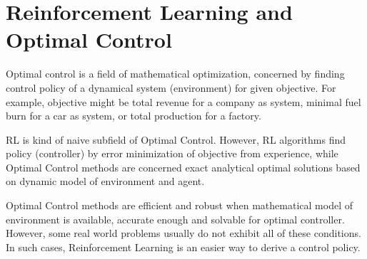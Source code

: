 \section{Reinforcement Learning and Optimal Control}
\label{sec:rl_and_control}

Optimal control is a field of mathematical optimization, 
concerned by  finding control policy of a dynamical system (environment) for given objective. 
For example, objective might be total revenue for a company as system, 
minimal fuel burn for a car as system, or total production for a factory. 

RL is kind of naive subfield of Optimal Control. 
However, RL algorithms find policy (controller) by error minimization of objective from experience, 
while Optimal Control methods are concerned exact analytical optimal solutions based on dynamic model of environment and agent. 

Optimal Control methods are efficient and robust when mathematical model of environment is available, 
accurate enough and solvable for optimal controller. 
However, some real world problems usually do not exhibit all of these conditions. 
In such cases, Reinforcement Learning is an easier way to derive a control policy.
